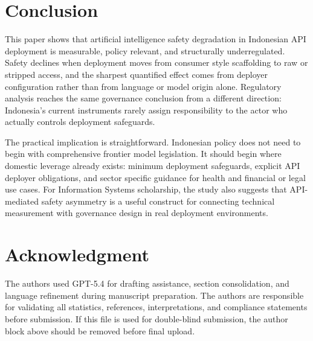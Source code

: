 \documentclass[conference]{IEEEtran}
\begin{document}
\section{Conclusion}
This paper shows that artificial intelligence safety degradation in Indonesian API deployment is measurable, policy relevant, and structurally underregulated. Safety declines when deployment moves from consumer style scaffolding to raw or stripped access, and the sharpest quantified effect comes from deployer configuration rather than from language or model origin alone. Regulatory analysis reaches the same governance conclusion from a different direction: Indonesia's current instruments rarely assign responsibility to the actor who actually controls deployment safeguards.

The practical implication is straightforward. Indonesian policy does not need to begin with comprehensive frontier model legislation. It should begin where domestic leverage already exists: minimum deployment safeguards, explicit API deployer obligations, and sector specific guidance for health and financial or legal use cases. For Information Systems scholarship, the study also suggests that API-mediated safety asymmetry is a useful construct for connecting technical measurement with governance design in real deployment environments.

\section*{Acknowledgment}
The authors used GPT-5.4 for drafting assistance, section consolidation, and language refinement during manuscript preparation. The authors are responsible for validating all statistics, references, interpretations, and compliance statements before submission. If this file is used for double-blind submission, the author block above should be removed before final upload.
\end{document}
